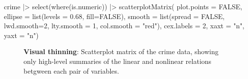 \documentclass[
  letterpaper,
  10pt,
  krantz2]{krantz}
\makeatletter
\newenvironment{Shaded}{\begin{snugshade}}{\end{snugshade}}
\newcommand{\AttributeTok}[1]{\textcolor[rgb]{0.40,0.45,0.13}{#1}}
\newcommand{\ConstantTok}[1]{\textcolor[rgb]{0.56,0.35,0.01}{#1}}
\newcommand{\DecValTok}[1]{\textcolor[rgb]{0.68,0.00,0.00}{#1}}
\newcommand{\FloatTok}[1]{\textcolor[rgb]{0.68,0.00,0.00}{#1}}
\newcommand{\FunctionTok}[1]{\textcolor[rgb]{0.28,0.35,0.67}{#1}}
\newcommand{\NormalTok}[1]{\textcolor[rgb]{0.00,0.23,0.31}{#1}}
\newcommand{\SpecialCharTok}[1]{\textcolor[rgb]{0.37,0.37,0.37}{#1}}
\newcommand{\StringTok}[1]{\textcolor[rgb]{0.13,0.47,0.30}{#1}}
\newenvironment{kframe}{%
  \medskip{}
  \setlength{\fboxsep}{.8em}
  \def\at@end@of@kframe{}%
  \ifinner\ifhmode%
  \def\at@end@of@kframe{\end{minipage}}%
  \begin{minipage}{\columnwidth}%
  \fi\fi%
  \def\FrameCommand##1{\hskip\@totalleftmargin \hskip-\fboxsep
  \colorbox{shadecolor}{##1}\hskip-\fboxsep
      \hskip-\linewidth \hskip-\@totalleftmargin \hskip\columnwidth}%
  \MakeFramed {\advance\hsize-\width
    \@totalleftmargin\z@ \linewidth\hsize
    \@setminipage}}%
{\par\unskip\endMakeFramed%
  \at@end@of@kframe}
\renewenvironment{Shaded}{\begin{kframe}}{\end{kframe}}
\makeatother
\begin{document}
\begin{Shaded}
\begin{Highlighting}[]
\NormalTok{crime }\SpecialCharTok{|\textgreater{}}
  \FunctionTok{select}\NormalTok{(}\FunctionTok{where}\NormalTok{(is.numeric)) }\SpecialCharTok{|\textgreater{}}
  \FunctionTok{scatterplotMatrix}\NormalTok{(}
    \AttributeTok{plot.points =} \ConstantTok{FALSE}\NormalTok{,}
    \AttributeTok{ellipse =} \FunctionTok{list}\NormalTok{(}\AttributeTok{levels =} \FloatTok{0.68}\NormalTok{, }\AttributeTok{fill=}\ConstantTok{FALSE}\NormalTok{),}
    \AttributeTok{smooth =} \FunctionTok{list}\NormalTok{(}\AttributeTok{spread =} \ConstantTok{FALSE}\NormalTok{, }
                  \AttributeTok{lwd.smooth=}\DecValTok{2}\NormalTok{, }\AttributeTok{lty.smooth =} \DecValTok{1}\NormalTok{, }\AttributeTok{col.smooth =} \StringTok{"red"}\NormalTok{),}
    \AttributeTok{cex.labels =} \DecValTok{2}\NormalTok{,}
    \AttributeTok{xaxt =} \StringTok{"n"}\NormalTok{, }\AttributeTok{yaxt =} \StringTok{"n"}\NormalTok{)}
\end{Highlighting}
\end{Shaded}

\begin{figure}[H]


\caption{\label{fig-crime-spm}\textbf{Visual thinning}: Scatterplot
matrix of the crime data, showing only high-level summaries of the
linear and nonlinear relations betgween each pair of variables.}

\end{figure}%
\end{document}
